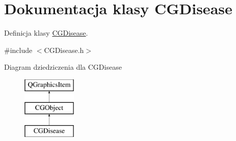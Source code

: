 \hypertarget{class_c_g_disease}{}\section{Dokumentacja klasy C\+G\+Disease}
\label{class_c_g_disease}


Definicja klasy \mbox{\hyperlink{class_c_g_disease}{C\+G\+Disease}}.  




{\ttfamily \#include $<$C\+G\+Disease.\+h$>$}

Diagram dziedziczenia dla C\+G\+Disease\begin{figure}[H]
\begin{center}
\leavevmode
\includegraphics[height=3.000000cm]{class_c_g_disease}
\end{center}
\end{figure}
